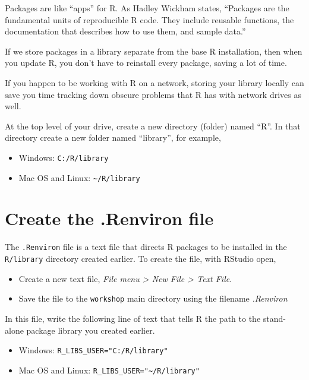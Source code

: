 \documentclass[
]{book}
\providecommand{\tightlist}{%
  \setlength{\itemsep}{0pt}\setlength{\parskip}{0pt}}
\begin{document}
Packages are like ``apps'' for R. As Hadley Wickham states, ``Packages are the fundamental units
of reproducible R code. They include reusable functions, the
documentation that describes how to use them, and sample data.''

If we store packages in a library separate from the base R installation,
then when you update R, you don't have to reinstall every package,
saving a lot of time.

If you happen to be working with R on a network, storing your library locally can save you time tracking down obscure problems that R has with network drives as well.

At the top level of your drive, create a new directory (folder) named
``R''. In that directory create a new folder named ``library'', for
example,

\begin{itemize}
\tightlist
\item
  Windows: \texttt{C:/R/library}\\
\item
  Mac OS and Linux: \texttt{\textasciitilde{}/R/library}
\end{itemize}

\hypertarget{create-the-.renviron-file}{%
\section{Create the .Renviron file}\label{create-the-.renviron-file}}

The \texttt{.Renviron} file is a text file that directs R packages to be
installed in the \texttt{R/library} directory created earlier. To create the
file, with RStudio open,

\begin{itemize}
\tightlist
\item
  Create a new text file, \emph{File menu \textgreater{} New File \textgreater{} Text File}.
\item
  Save the file to the \texttt{workshop} main directory using the filename
  \emph{.Renviron}
\end{itemize}

In this file, write the following line of text that tells R the path to
the stand-alone package library you created earlier.

\begin{itemize}
\tightlist
\item
  Windows: \texttt{R\_LIBS\_USER="C:/R/library"}
\item
  Mac OS and Linux: \texttt{R\_LIBS\_USER="\textasciitilde{}/R/library"}
\end{itemize}
\end{document}
